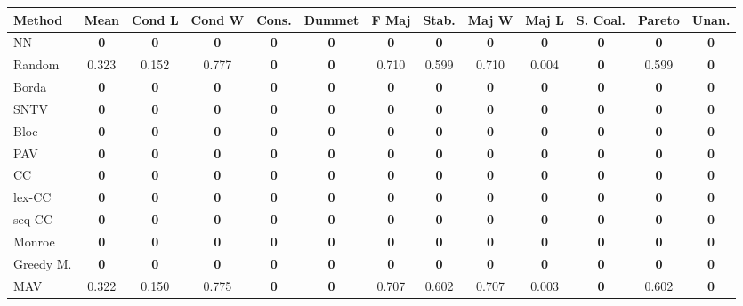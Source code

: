 \begin{tabular}{lcccccccccccc}
\toprule
Method & Mean & Cond L & Cond W & Cons. & Dummet & F Maj & Stab. & Maj W & Maj L & S. Coal. & Pareto & Unan. \\
\midrule
NN & \textbf{0} & \textbf{0} & \textbf{0} & \textbf{0} & \textbf{0} & \textbf{0} & \textbf{0} & \textbf{0} & \textbf{0} & \textbf{0} & \textbf{0} & \textbf{0} \\
Random & 0.323 & 0.152 & 0.777 & \textbf{0} & \textbf{0} & 0.710 & 0.599 & 0.710 & 0.004 & \textbf{0} & 0.599 & \textbf{0} \\
Borda & \textbf{0} & \textbf{0} & \textbf{0} & \textbf{0} & \textbf{0} & \textbf{0} & \textbf{0} & \textbf{0} & \textbf{0} & \textbf{0} & \textbf{0} & \cellcolor{green!25}\textbf{0} \\
SNTV & \textbf{0} & \textbf{0} & \textbf{0} & \cellcolor{green!25}\textbf{0} & \textbf{0} & \textbf{0} & \textbf{0} & \textbf{0} & \textbf{0} & \cellcolor{green!25}\textbf{0} & \textbf{0} & \textbf{0} \\
Bloc & \textbf{0} & \textbf{0} & \textbf{0} & \textbf{0} & \textbf{0} & \cellcolor{green!25}\textbf{0} & \textbf{0} & \textbf{0} & \textbf{0} & \textbf{0} & \cellcolor{green!25}\textbf{0} & \cellcolor{green!25}\textbf{0} \\
PAV & \textbf{0} & \textbf{0} & \textbf{0} & \textbf{0} & \textbf{0} & \textbf{0} & \textbf{0} & \textbf{0} & \textbf{0} & \textbf{0} & \cellcolor{green!25}\textbf{0} & \textbf{0} \\
CC & \textbf{0} & \textbf{0} & \textbf{0} & \cellcolor{green!25}\textbf{0} & \textbf{0} & \textbf{0} & \textbf{0} & \textbf{0} & \textbf{0} & \textbf{0} & \textbf{0} & \textbf{0} \\
lex-CC & \textbf{0} & \textbf{0} & \textbf{0} & \textbf{0} & \textbf{0} & \textbf{0} & \textbf{0} & \textbf{0} & \textbf{0} & \textbf{0} & \textbf{0} & \textbf{0} \\
seq-CC & \textbf{0} & \textbf{0} & \textbf{0} & \textbf{0} & \textbf{0} & \textbf{0} & \textbf{0} & \textbf{0} & \textbf{0} & \textbf{0} & \textbf{0} & \textbf{0} \\
Monroe & \textbf{0} & \textbf{0} & \textbf{0} & \cellcolor{green!25}\textbf{0} & \textbf{0} & \textbf{0} & \textbf{0} & \textbf{0} & \textbf{0} & \textbf{0} & \textbf{0} & \cellcolor{green!25}\textbf{0} \\
Greedy M. & \textbf{0} & \textbf{0} & \textbf{0} & \cellcolor{green!25}\textbf{0} & \textbf{0} & \textbf{0} & \textbf{0} & \textbf{0} & \textbf{0} & \cellcolor{green!25}\textbf{0} & \textbf{0} & \cellcolor{green!25}\textbf{0} \\
MAV & 0.322 & 0.150 & 0.775 & \textbf{0} & \textbf{0} & 0.707 & 0.602 & 0.707 & 0.003 & \textbf{0} & 0.602 & \textbf{0} \\
\bottomrule
\end{tabular}

